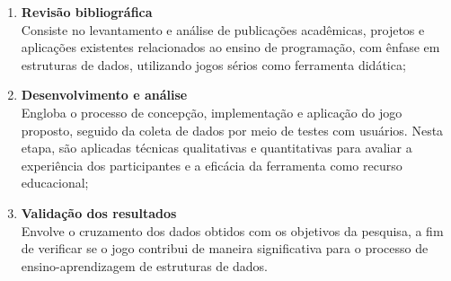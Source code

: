 \begin{enumerate}
  \item \textbf{Revisão bibliográfica} \\
    Consiste no levantamento e análise de publicações acadêmicas, projetos e aplicações existentes relacionados ao ensino de programação, com ênfase em estruturas de dados, utilizando jogos sérios como ferramenta didática;

  \item \textbf{Desenvolvimento e análise} \\
    Engloba o processo de concepção, implementação e aplicação do jogo proposto, seguido da coleta de dados por meio de testes com usuários. Nesta etapa, são aplicadas técnicas qualitativas e quantitativas para avaliar a experiência dos participantes e a eficácia da ferramenta como recurso educacional;

  \item \textbf{Validação dos resultados} \\
    Envolve o cruzamento dos dados obtidos com os objetivos da pesquisa, a fim de verificar se o jogo contribui de maneira significativa para o processo de ensino-aprendizagem de estruturas de dados.
\end{enumerate}
